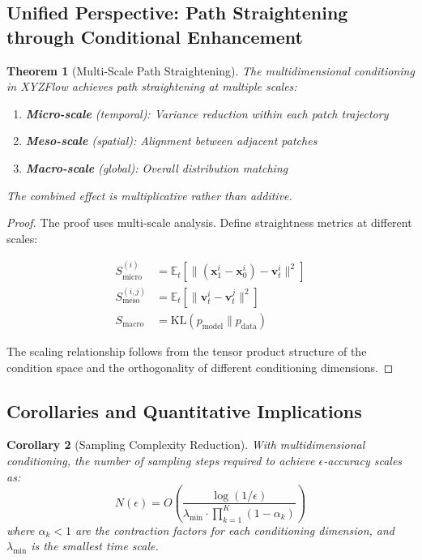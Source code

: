 \documentclass{article}
\theoremstyle{plain}
\newtheorem{theorem}{Theorem}[section]
\newtheorem{corollary}[theorem]{Corollary}
\theoremstyle{definition}
\theoremstyle{remark}
\newcommand{\vx}{\mathbf{x}}
\newcommand{\vv}{\mathbf{v}}
\begin{document}
\subsection{Unified Perspective: Path Straightening through Conditional Enhancement}

\begin{theorem}[Multi-Scale Path Straightening]
\label{thm:multi_scale_straightening}
The multidimensional conditioning in XYZFlow achieves path straightening at multiple scales:
\begin{enumerate}
    \item \textbf{Micro-scale} (temporal): Variance reduction within each patch trajectory
    \item \textbf{Meso-scale} (spatial): Alignment between adjacent patches
    \item \textbf{Macro-scale} (global): Overall distribution matching
\end{enumerate}
The combined effect is multiplicative rather than additive.
\end{theorem}

\begin{proof}
The proof uses multi-scale analysis. Define straightness metrics at different scales:

\begin{align}
S_{\text{micro}}^{(i)} &= \mathbb{E}_t[\|(\vx_1^i - \vx_0^i) - \vv_t^i\|^2] \\
S_{\text{meso}}^{(i,j)} &= \mathbb{E}_t[\|\vv_t^i - \vv_t^j\|^2] \\
S_{\text{macro}} &= \text{KL}(p_{\text{model}} \| p_{\text{data}})
\end{align}

The scaling relationship follows from the tensor product structure of the condition space and the orthogonality of different conditioning dimensions.
\end{proof}

\subsection{Corollaries and Quantitative Implications}

\begin{corollary}[Sampling Complexity Reduction]
With multidimensional conditioning, the number of sampling steps required to achieve $\epsilon$-accuracy scales as:
\begin{equation}
N(\epsilon) = O\left(\frac{\log(1/\epsilon)}{\lambda_{\text{min}} \cdot \prod_{k=1}^K (1 - \alpha_k)}\right)
\end{equation}
where $\alpha_k < 1$ are the contraction factors for each conditioning dimension, and $\lambda_{\text{min}}$ is the smallest time scale.
\end{corollary}
\end{document}
